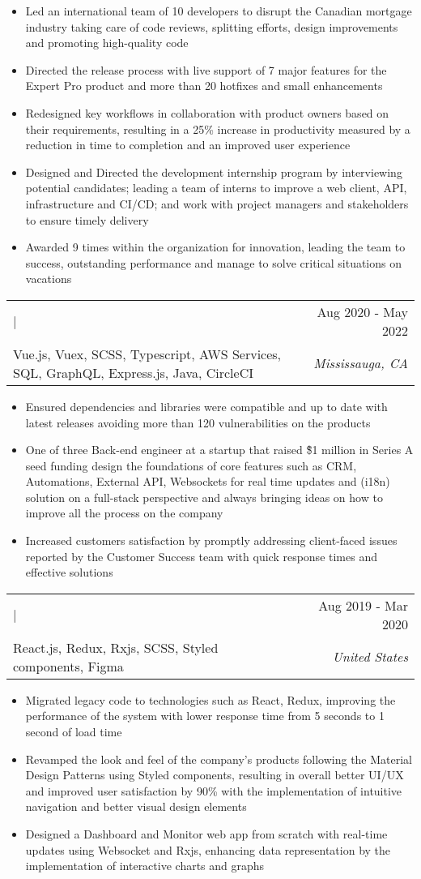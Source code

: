 \documentclass[letterpaper,10.8pt]{article}
\makeatletter
\newcommand{\normalFont}[1]{\fontsize{9.5pt}{11pt}{\selectfont{#1}}}
\newcommand{\largeFont}[1]{\fontsize{11pt}{11pt}{\selectfont{#1}}}
\newcommand{\resumeItem}[2]{
  \item{
      { #2 \vspace{-3.4pt}}
    }
  }
\newcommand{\resumeSubheading}[5]{
    \begin{tabular*}{1\textwidth}{l@{\extracolsep{\fill}}r}
      \largeFont{\color{mypink1}\textbf{#1}} | \normalFont{#3} & \small{#4} \\
      {\normalFont{Stack: } #5} & \textit{\small #2} \\
    \end{tabular*}\vspace{-8pt}
  }
\newcommand{\resumeItemListStart}{\begin{itemize}}
\newcommand{\resumeItemListEnd}{\end{itemize}\vspace{4pt}}
\makeatother
\begin{document}
\resumeItemListStart
\resumeItem{Technical Desicion Architect}
{Led an international team of 10 developers to disrupt the Canadian mortgage industry taking care of code reviews, splitting efforts, design improvements and promoting high-quality code}
\resumeItem{Release Process Coordinator}
{Directed the release process with live support of 7 major features for the Expert Pro product and more than 20 hotfixes and small enhancements}
\resumeItem{Core Feature Designer}{Redesigned key workflows in collaboration with product owners based on their requirements, resulting in a 25\% increase in productivity measured by a reduction in time to completion and an improved user experience}
\resumeItem{Development Internship Program Director}{Designed and Directed the development internship program by interviewing potential candidates; leading a team of interns to improve a web client, API, infrastructure and CI/CD; and work with project managers and stakeholders to ensure timely delivery}
\resumeItem{Recognized for Outstanding Performance}{Awarded 9 times within the organization for innovation, leading the team to success, outstanding performance and manage to solve critical situations on vacations}
\resumeItemListEnd

\resumeSubheading
{Founding Software Engineer}{Mississauga, CA}
{Doorr (acquired by Finastra)}{Aug 2020 -  May 2022}
{Vue.js, Vuex, SCSS, Typescript, AWS Services, SQL, GraphQL, Express.js, Java, CircleCI}

\resumeItemListStart
\resumeItem{Library Compatibility Manager}
{Ensured dependencies and libraries were compatible and up to date with latest releases avoiding more than 120 vulnerabilities on the products}
\resumeItem{Startup Contributor}
{One of three Back-end engineer at a startup that raised \~\$1 million in Series A seed funding design the foundations of core features such as CRM, Automations, External API, Websockets for real time updates and (i18n) solution on a full-stack perspective and always bringing ideas on how to improve all the process on the company}
\resumeItem{Production Code Fixer}
{Increased customers satisfaction by promptly addressing client-faced issues reported by the Customer Success team with quick response times and effective solutions}
\resumeItemListEnd

\resumeSubheading
{Frontend Developer}{United States}
{Telesero}{Aug 2019 - Mar 2020}
{React.js, Redux, Rxjs, SCSS, Styled components, Figma}

\resumeItemListStart
\resumeItem{Legacy Code Migration Specialist}
{Migrated legacy code to technologies such as React, Redux, improving the performance of the system with lower response time from 5 seconds to 1 second of load time }
\resumeItem{Material Design Expert}
{Revamped the look and feel of the company’s products following the Material Design Patterns using Styled components, resulting in overall better UI/UX and improved user satisfaction by 90\% with the implementation of intuitive navigation and better visual design elements }
\resumeItem{Dashboard and Monitor Web App Designer}
{Designed a Dashboard and Monitor web app from scratch with real-time updates using Websocket and Rxjs, enhancing data representation by the implementation of interactive charts and graphs}
\resumeItemListEnd
\end{document}
